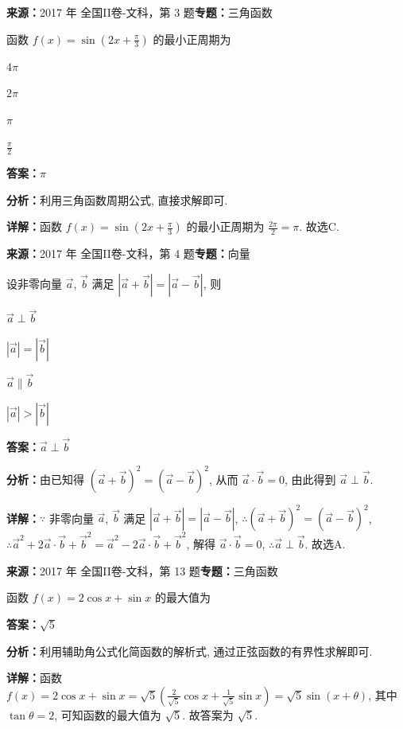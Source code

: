 \begin{question}[points=5]
\textbf{来源：}2017 年 全国II卷-文科，第 3 题\quad \textbf{专题：}三角函数\par
函数 $f(x)=\sin\left(2x+\frac{\pi}{3}\right)$ 的最小正周期为
\begin{choices}
  \item $4\pi$
  \item $2\pi$
  \item $\pi$
  \item $\frac{\pi}{2}$
\end{choices}
\begin{solution}
\textbf{答案：}$\pi$

\textbf{分析：}利用三角函数周期公式, 直接求解即可.

\textbf{详解：}函数 $f(x)=\sin\left(2x+\frac{\pi}{3}\right)$ 的最小正周期为 $\frac{2\pi}{2}=\pi$. 故选C.
\end{solution}
\end{question}

\begin{question}[points=5]
\textbf{来源：}2017 年 全国II卷-文科，第 4 题\quad \textbf{专题：}向量\par
设非零向量 $\vec{a}$, $\vec{b}$ 满足 $|\vec{a}+\vec{b}|=|\vec{a}-\vec{b}|$, 则
\begin{choices}
  \item $\vec{a}\perp\vec{b}$
  \item $|\vec{a}|=|\vec{b}|$
  \item $\vec{a}\parallel\vec{b}$
  \item $|\vec{a}|>|\vec{b}|$
\end{choices}
\begin{solution}
\textbf{答案：}$\vec{a}\perp\vec{b}$

\textbf{分析：}由已知得 $(\vec{a}+\vec{b})^2=(\vec{a}-\vec{b})^2$, 从而 $\vec{a}\cdot\vec{b}=0$, 由此得到 $\vec{a}\perp\vec{b}$.

\textbf{详解：}$\because$ 非零向量 $\vec{a}$, $\vec{b}$ 满足 $|\vec{a}+\vec{b}|=|\vec{a}-\vec{b}|$, $\therefore (\vec{a}+\vec{b})^2=(\vec{a}-\vec{b})^2$, $\therefore \vec{a}^2+2\vec{a}\cdot\vec{b}+\vec{b}^2=\vec{a}^2-2\vec{a}\cdot\vec{b}+\vec{b}^2$, 解得 $\vec{a}\cdot\vec{b}=0$, $\therefore \vec{a}\perp\vec{b}$. 故选A.
\end{solution}
\end{question}

\begin{question}[points=5]
\textbf{来源：}2017 年 全国II卷-文科，第 13 题\quad \textbf{专题：}三角函数\par
函数 $f(x)=2\cos x+\sin x$ 的最大值为
\fillin[{$\sqrt{5}$}]
\begin{solution}
\textbf{答案：}$\sqrt{5}$

\textbf{分析：}利用辅助角公式化简函数的解析式, 通过正弦函数的有界性求解即可.

\textbf{详解：}函数 $f(x)=2\cos x+\sin x=\sqrt{5}\left(\frac{2}{\sqrt{5}}\cos x+\frac{1}{\sqrt{5}}\sin x\right)=\sqrt{5}\sin(x+\theta)$, 其中 $\tan\theta=2$, 可知函数的最大值为 $\sqrt{5}$. 故答案为 $\sqrt{5}$.
\end{solution}
\end{question}


